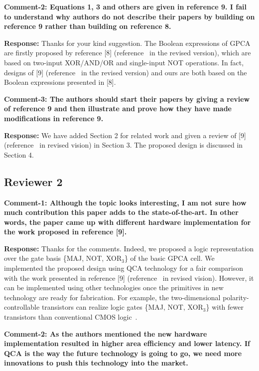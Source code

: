 \documentclass[9pt,journal,compsoc]{IEEEtran}
\begin{document}
\begin{appendices}
{\bfseries Comment-2: Equations 1, 3 and others are given in reference 9. I fail to understand why authors do not describe their papers by building on reference 9 rather than building on reference 8.}

{\bfseries Response:} Thanks for your kind suggestion. The Boolean expressions of GPCA are firstly proposed by reference [8] (reference~\cite{4} in the revised version), which are based on two-input XOR/AND/OR and single-input NOT operations. In fact, designs of [9] (reference~\cite{2} in the revised version) and ours are both based on the Boolean expressions presented in [8]. 

{\bfseries Comment-3: The authors should start their papers by giving a review of reference 9 and then illustrate and prove how they have made modifications in reference 9.}

{\bfseries Response:} We have added Section 2 for related work and given a review of [9] (reference~\cite{2} in revised vision) in Section 3. The proposed design is discussed in Section 4.

\subsection{ Reviewer 2}
{\bfseries Comment-1: Although the topic looks interesting, I am not sure how much contribution this paper adds to the state-of-the-art. In other words, the paper came up with different hardware implementation for the work proposed in reference [9].}

{\bfseries Response:} Thanks for the comments. Indeed, we proposed a logic representation over the gate basis \{MAJ, NOT, XOR$_3$\} of the basic GPCA cell. We implemented the proposed design using QCA technology for a fair comparison with the work presented in reference [9] (reference~\cite{2} in revised vision). 
However, it can be implemented using other technologies once the primitives in new technology are ready for fabrication.
For example, the two-dimensional polarity-controllable transistors can realize logic gates \{MAJ, NOT, XOR$_3$\} with fewer transistors than conventional CMOS logic~\cite{resta2018doping}.    

{\bfseries Comment-2: As the authors mentioned the new hardware implementation resulted in higher area efficiency and lower latency. If QCA is the way the future technology is going to go, we need more innovations to push this technology into the market. }


\end{appendices}
\end{document}
